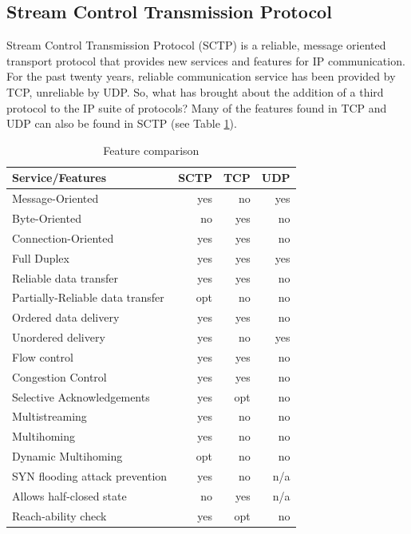\documentclass[a4paper]{article}
\begin{document}
\subsection{Stream Control Transmission Protocol}
Stream Control Transmission Protocol (SCTP) is a reliable, message oriented transport protocol that provides new services and features for IP communication. For the past twenty years, reliable communication service has been provided by TCP, unreliable by UDP. So, what has brought about the addition of a third protocol to the IP suite of protocols? Many of the features found in TCP and UDP can also be found in SCTP (see Table \ref{tab_sctp_features}).
\begin{table}[H]
	\centering
	\begin{tabular}{ | l | r | r | r | }
		\hline
		Service/Features & SCTP & TCP & UDP \\ \hline \hline
		Message-Oriented & yes & no & yes \\ \hline
		Byte-Oriented & no & yes & no \\ \hline
		Connection-Oriented & yes & yes & no \\ \hline
		Full Duplex & yes & yes & yes \\ \hline
		Reliable data transfer & yes & yes & no \\ \hline
		Partially-Reliable data transfer & opt & no & no \\ \hline
		Ordered data delivery & yes & yes & no \\ \hline
		Unordered delivery & yes & no & yes \\ \hline
		Flow control & yes & yes & no \\ \hline
		Congestion Control & yes & yes & no \\ \hline
		Selective Acknowledgements & yes & opt & no \\ \hline
		Multistreaming & yes & no & no \\ \hline
		Multihoming & yes & no & no \\ \hline
		Dynamic Multihoming & opt & no & no \\ \hline
		SYN flooding attack prevention & yes & no & n/a \\ \hline
		Allows half-closed state & no & yes & n/a \\ \hline
		Reach-ability check & yes & opt & no \\ \hline
	\end{tabular}
	\caption{Feature comparison}
	\label{tab_sctp_features}
\end{table}
\end{document}
